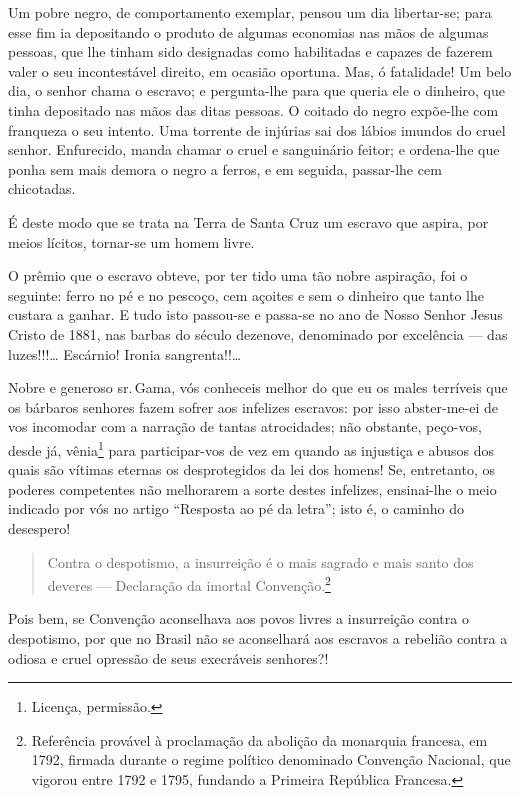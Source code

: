 Um pobre negro, de comportamento exemplar, pensou um dia libertar-se;
para esse fim ia depositando o produto de algumas economias nas mãos de
algumas pessoas, que lhe tinham sido designadas como habilitadas e
capazes de fazerem valer o seu incontestável direito, em ocasião
oportuna. Mas, ó fatalidade! Um belo dia, o senhor chama o escravo; e
pergunta-lhe para que queria ele o dinheiro, que tinha depositado nas
mãos das ditas pessoas. O coitado do negro expõe-lhe com franqueza o seu
intento. Uma torrente de injúrias sai dos lábios imundos do cruel
senhor. Enfurecido, manda chamar o cruel e sanguinário feitor; e
ordena-lhe que ponha sem mais demora o negro a ferros, e em seguida,
passar-lhe cem chicotadas.

É deste modo que se trata na Terra de Santa Cruz um escravo que aspira,
por meios lícitos, tornar-se um homem livre.

O prêmio que o escravo obteve, por ter tido uma tão nobre aspiração, foi
o seguinte: ferro no pé e no pescoço, cem açoites e sem o dinheiro que
tanto lhe custara a ganhar. E tudo isto passou-se e passa-se no ano de
Nosso Senhor Jesus Cristo de 1881, nas barbas do século dezenove,
denominado por excelência --- das luzes!!!\ldots{} Escárnio! Ironia
sangrenta!!\ldots{}

Nobre e generoso sr.\,Gama, vós conheceis melhor do que eu os males
terríveis que os bárbaros senhores fazem sofrer aos infelizes escravos:
por isso abster-me-ei de vos incomodar com a narração de tantas
atrocidades; não obstante, peço-vos, desde já, vênia\footnote{Licença,
  permissão.} para participar-vos de vez em quando as injustiça e abusos
dos quais são vítimas eternas os desprotegidos da lei dos homens! Se,
entretanto, os poderes competentes não melhorarem a sorte destes
infelizes, ensinai-lhe o meio indicado por vós no artigo ``Resposta
ao pé da letra''; isto é, o caminho do desespero!

\begin{quote}
Contra o despotismo, a insurreição é o mais sagrado e mais santo dos
deveres --- Declaração da imortal Convenção.\footnote{Referência
  provável à proclamação da abolição da monarquia francesa, em 1792,
  firmada durante o regime político denominado Convenção Nacional, que
  vigorou entre 1792 e 1795, fundando a Primeira República Francesa.}
\end{quote}

Pois bem, se Convenção aconselhava aos povos livres a insurreição contra
o despotismo, por que no Brasil não se aconselhará aos escravos a
rebelião contra a odiosa e cruel opressão de seus execráveis senhores?!

